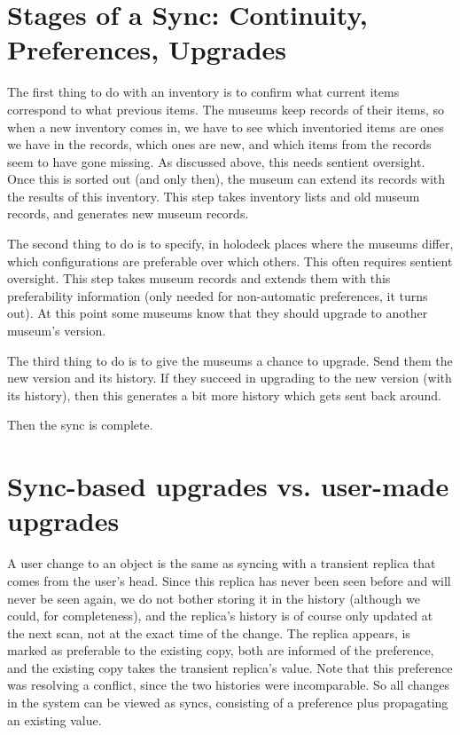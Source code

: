 \documentclass{book}
\begin{document}
\section{Stages of a Sync: Continuity, Preferences, Upgrades}

The first thing to do with an inventory is to confirm what current items correspond to what previous items.  The museums keep records of their items, so when a new inventory comes in, we have to see which inventoried items are ones we have in the records, which ones are new, and which items from the records seem to have gone missing.  As discussed above, this needs sentient oversight.  Once this is sorted out (and only then), the museum can extend its records with the results of this inventory.  This step takes inventory lists and old museum records, and generates new museum records.

The second thing to do is to specify, in holodeck places where the museums differ, which configurations are preferable over which others.  This often requires sentient oversight.  This step takes museum records and extends them with this preferability information (only needed for non-automatic preferences, it turns out).  At this point some museums know that they should upgrade to another museum's version.

The third thing to do is to give the museums a chance to upgrade.  Send them the new version and its history.  If they succeed in upgrading to the new version (with its history), then this generates a bit more history which gets sent back around.

Then the sync is complete.
\section{Sync-based upgrades vs. user-made upgrades}

A user change to an object is the same as syncing with a transient replica that comes from the user's head.  Since this replica has never been seen before and will never be seen again, we do not bother storing it in the history (although we could, for completeness), and the replica's history is of course only updated at the next scan, not at the exact time of the change.  The replica appears, is marked as preferable to the existing copy, both are informed of the preference, and the existing copy takes the transient replica's value.  Note that this preference was resolving a conflict, since the two histories were incomparable.  So all changes in the system can be viewed as syncs, consisting of a preference plus propagating an existing value.
\end{document}
